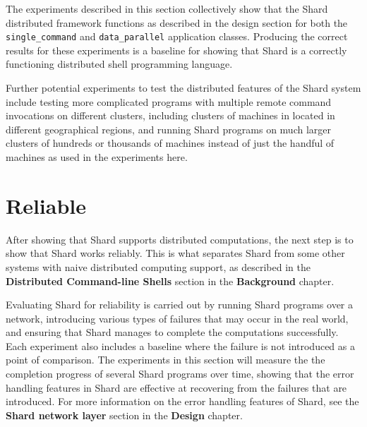 \documentclass[oneside]{report}
\begin{document}
The experiments described in this section collectively show that the Shard distributed framework functions as described in the design section for both the \texttt{single\_command} and \texttt{data\_parallel} application classes.
Producing the correct results for these experiments is a baseline for showing that Shard is a correctly functioning distributed shell programming language.

Further potential experiments to test the distributed features of the Shard system include testing more complicated programs with multiple remote command invocations on different clusters, including clusters of machines in located in different geographical regions, and running Shard programs on much larger clusters of hundreds or thousands of machines instead of just the handful of machines as used in the experiments here.

\section{Reliable}


After showing that Shard supports distributed computations, the next step is to show that Shard works reliably.
This is what separates Shard from some other systems with naive distributed computing support, as described in the \textbf{Distributed Command-line Shells} section in the \textbf{Background} chapter.

Evaluating Shard for reliability is carried out by running Shard programs over a network, introducing various types of failures that may occur in the real world, and ensuring that Shard manages to complete the computations successfully.
Each experiment also includes a baseline where the failure is not introduced as a point of comparison.
The experiments in this section will measure the the completion progress of several Shard programs over time, showing that the error handling features in Shard are effective at recovering from the failures that are introduced.
For more information on the error handling features of Shard, see the \textbf{Shard network layer} section in the \textbf{Design} chapter.
\end{document}
